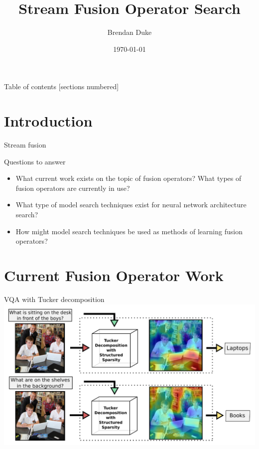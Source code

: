 \documentclass{beamer}
\title{Stream Fusion Operator Search}
\date{\today}
\author{Brendan Duke}
\institute{University of Guelph}
\begin{document}
\maketitle

\begin{frame}{Table of contents}
  [sections numbered]
  \tableofcontents[hideallsubsections]
\end{frame}


\section{Introduction}

\begin{frame}{Stream fusion}
        \center{}
        \scalebox{.65}{}
\end{frame}

\begin{frame}[fragile]{Questions to answer}
        \begin{itemize}[<+- | alert@+>]
                \item What current work exists on the topic of fusion
                        operators? What types of fusion operators are currently
                        in use?

                \item What type of model search techniques exist for neural
                        network architecture search?

                \item How might model search techniques be used as methods of
                        learning fusion operators?
        \end{itemize}
\end{frame}


\section{Current Fusion Operator Work}

{%
\begin{frame}{VQA with Tucker decomposition}
        \center{}
        \vspace{-0.8cm}
        \hspace*{-0.8cm}
        \includegraphics[scale=0.31]{data/mutan_vqa_intro}
\end{frame}
}
\end{document}

